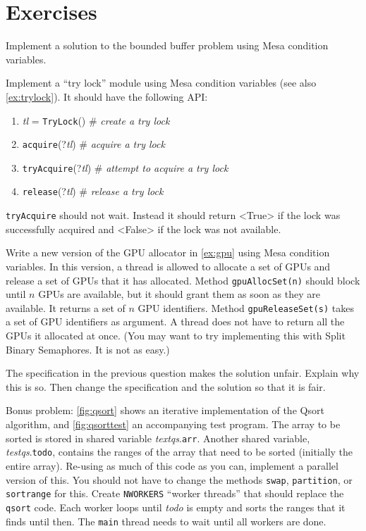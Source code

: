 \documentclass{report}
\begin{document}
{\section*{Exercises}
\begin{problems}
\item \label{ex:bbmesa} Implement a solution to the bounded buffer problem using Mesa condition
variables.
\item Implement a ``try lock'' module using Mesa condition variables
(see also \autoref{ex:trylock}).  It should
have the following API:
\begin{enumerate}
\item \textit{tl} = \texttt{TryLock}() \# \emph{create a try lock}
\item \texttt{acquire}(?\textit{tl}) \# \emph{acquire a try lock}
\item \texttt{tryAcquire}(?\textit{tl}) \# \emph{attempt to acquire a try lock}
\item \texttt{release}(?\textit{tl}) \# \emph{release a try lock}
\end{enumerate}
\noindent
\texttt{tryAcquire} should not wait.
Instead it should return <{True}> if the lock was successfully
acquired and <{False}> if the lock was not available.
\item Write a new version of the GPU allocator in \autoref{ex:gpu}
using Mesa condition variables.
In this version,
a thread is allowed to allocate a set of GPUs and release a set of GPUs that it
has allocated.  Method \texttt{gpuAllocSet(n)} should block until $n$ GPUs are
available, but it should grant them as soon as they are available.
It returns a set of $n$ GPU identifiers.
Method \texttt{gpuReleaseSet(s)} takes a set of GPU identifiers as argument.
A thread does not have to return all the GPUs it allocated at once.
(You may want to try implementing this with Split Binary Semaphores.  It is not as easy.)
\item The specification in the previous question makes the solution unfair.
Explain why this is so.  Then change the specification and the solution so that
it is fair.
\item \label{ex:qsort}
Bonus problem: \autoref{fig:qsort} shows an iterative implementation of the Qsort
algorithm, and \autoref{fig:qsorttest} an accompanying test program.
The array to be sorted is stored in shared variable \textit{textqs}.\texttt{arr}.
Another shared variable, \textit{testqs}.\texttt{todo}, contains the ranges of the
array that need to be sorted (initially the entire array).
Re-using as much of this code as you can, implement a parallel version of
this.  You should not have to change the methods \texttt{swap}, \texttt{partition},
or \texttt{sortrange} for this.  Create \texttt{NWORKERS} ``worker threads''
that should replace the \texttt{qsort} code.
Each worker loops until \textit{todo}
is empty and sorts the ranges that it finds until then.  The \texttt{main}
thread needs to wait until all workers are done.
\end{problems}

}
\end{document}
